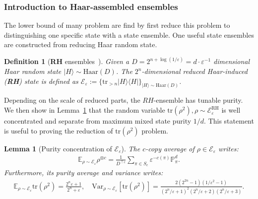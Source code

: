 \documentclass[aps,%
twocolumn,%
floatfix,%
pra,%
amsfonts,%
groupedaddress,%
superscriptaddress]{revtex4-2}%
\newtheorem{lemma}{Lemma}
\newtheorem{definition}{Definition}[section]
\newcommand{\bra}[1]{\langle #1\rvert}
\newcommand{\ket}[1]{\lvert #1\rangle}
\newcommand{\1}{\mathbbm{1}}
\begin{document}
\subsubsection{Introduction to Haar-assembled ensembles}
The lower bound of many problem are find by first reduce this problem to distinguishing one specific state with a state ensemble.
One useful state ensembles are constructed from reducing Haar random state.
\begin{definition}[\textbf{RH} ensembles~\cite{gong2024sample}]
    Given a $D = 2^{n + \log(1/\varepsilon)} = d\cdot \varepsilon^{-1}$ dimensional Haar random state $\ket{H} \sim \mathrm{Haar}(D)$. The $2^n$-dimensional reduced Haar-induced (\textbf{RH}) state is defined as $\mathcal{E}_{\varepsilon}:=\{\text{tr}_{>n} \ket{H}\!\bra{H}\}_{\ket{H} \sim \mathrm{Haar}(D)}$.
\end{definition}
Depending on the scale of reduced parts, the $RH$-ensemble has tunable purity.
We then show in Lemma~\ref{lemma:purity_of_RH} that the random variable $\mathrm{tr}(\rho^2), \rho \sim \mathcal{E}^{\mathrm{RH}}_{\varepsilon}$ is well concentrated and separate from maximum mixed state purity $1/d$.
This statement is useful to proving the reduction of $\mathrm{tr}(\rho^2)$ problem. 
\begin{lemma}[Purity concentration of $\mathcal{E}_{\varepsilon}$]
    \label{lemma:purity_of_RH}
    The $c$-copy average of $\rho \in \mathcal{E}_{\varepsilon}$ writes:
    \begin{align}
        \mathbb{E}_{\rho \sim \mathcal{E}_{\varepsilon}} \rho^{\otimes c} = \frac{1}{D^{\uparrow c}}\sum_{\pi \in S_c} \varepsilon^{-c(\pi)}\mathbb{P}_{\pi}^{d}.
    \end{align}
    Furthermore, its purity average and variance writes:
    \begin{align}
        \mathbb{E}_{\rho \sim \mathcal{E}_{\varepsilon}} \mathrm{tr}(\rho^2) = \frac{2^n\varepsilon + 1}{2^n + \varepsilon},\quad \mathrm{Var}_{\rho \sim \mathcal{E}_{\varepsilon}} [\mathrm{tr}(\rho^2)] = \frac{2(2^{2n} - 1)(1/\varepsilon^2-1)}{(2^n/\varepsilon + 1)^2 (2^n/\varepsilon+2)(2^n/\varepsilon+3)}.
    \end{align}
\end{lemma}
\end{document}
